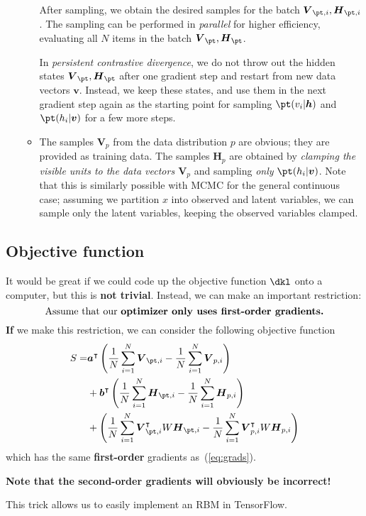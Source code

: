 \documentclass[11pt]{article}
\newcommand{\vbf}{\boldsymbol{v}}
\newcommand{\hbf}{\boldsymbol{h}}
\newcommand{\abf}{\boldsymbol{a}}
\newcommand{\bbf}{\boldsymbol{b}}
\newcommand{\Vbf}{\boldsymbol{V}}
\newcommand{\Hbf}{\boldsymbol{H}}
\begin{document}
\begin{itemize}
\begin{itemize}
After sampling, we obtain the desired samples for the batch $\Vbf_{\pt,i}, \Hbf_{\pt,i}$. The sampling can be performed in \textit{parallel} for higher efficiency, evaluating all $N$ items in the batch $\Vbf_{\pt}, \Hbf_{\pt}$.

In \textit{persistent contrastive divergence}, we do not throw out the hidden states $\Vbf_{\pt}, \Hbf_{\pt}$ after one gradient step and restart from new data vectors $\vbf$. Instead, we keep these states, and use them in the next gradient step again as the starting point for sampling $\pt(v_i | \hbf)$ and $\pt(h_i | \vbf)$ for a few more steps.

\item The samples $\Vbf_p$ from the data distribution $p$ are obvious; they are provided as training data. The samples $\Hbf_p$ are obtained by \textit{clamping the visible units to the data vectors $\Vbf_p$} and sampling \textit{only} $\pt(h_i | \vbf)$. Note that this is similarly possible with MCMC for the general continuous case; assuming we partition $x$ into observed and latent variables, we can sample only the latent variables, keeping the observed variables clamped.

\end{itemize} 
\end{itemize}


\subsection{Objective function}


It would be great if we could code up the objective function $\dkl$ onto a computer, but this is \textbf{not trivial}. Instead, we can make an important restriction:
\begin{equation*}
\text{Assume that our \textbf{optimizer only uses first-order gradients.}}
\end{equation*}
\textbf{If} we make this restriction, we can consider the following objective function
\begin{equation}
\begin{split}
S
=&
\abf^\intercal \left ( 
\frac{1}{N} \sum_{i=1}^N \Vbf_{\pt, i}
- \frac{1}{N} \sum_{i=1}^N \Vbf_{p, i}
\right ) \\
& +
\bbf^\intercal \left ( 
\frac{1}{N} \sum_{i=1}^N \Hbf_{\pt, i}
- \frac{1}{N} \sum_{i=1}^N \Hbf_{p, i} 
\right ) \\
& +
\left (
\frac{1}{N} \sum_{i=1}^N \Vbf_{\pt, i}^\intercal W \Hbf_{\pt, i}
- \frac{1}{N} \sum_{i=1}^N \Vbf_{p, i}^\intercal W \Hbf_{p, i}
\right )
\end{split}
\end{equation}
which has the same \textbf{first-order} gradients as~(\ref{eq:grads}). 

\textbf{Note that the second-order gradients will obviously be incorrect!}

This trick allows us to easily implement an RBM in TensorFlow.
\end{document}
